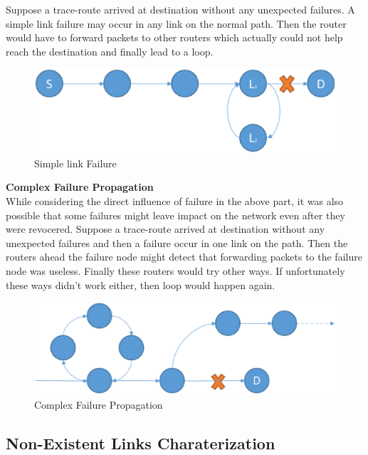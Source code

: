 \documentclass[conference, twocolumn, oneside, 10pt]{IEEEtran}
\begin{document}
Suppose a trace-route arrived at destination without any unexpected failures. A simple link failure may occur in any link on the normal path. Then the router would have to forward packets to other routers which actually could not help reach the destination and finally lead to a loop.

\begin{figure}[h!]
\centering
\includegraphics[scale=0.4]{plot/simple_link_failure.eps}
\caption{Simple link Failure}
\label{fig:asdf}
\end{figure}


\textbf{Complex Failure Propagation}\\

While considering the direct influence of failure in the above part, it was also possible that some failures might leave impact on the network even after they were revocered. Suppose a trace-route arrived at destination without any unexpected failures and then a failure occur in one link on the path. Then the routers ahead the failure node might detect that forwarding packets to the failure node was useless. Finally these routers would try other ways. If unfortunately these ways didn't work either, then loop would happen again.    

\begin{figure}[h!]
\centering
\includegraphics[scale=0.4]{plot/complex_failure_propagation.eps}
\caption{Complex Failure Propagation}
\label{fig:asdf}
\end{figure}

\subsection{Non-Existent Links Charaterization}
\end{document}
